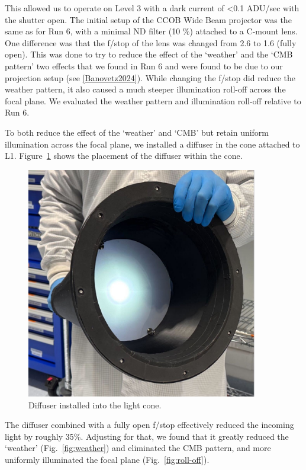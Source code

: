 This allowed us to operate on Level 3 with a dark current of
\textless0.1 ADU/sec with the shutter open. The initial setup of the
CCOB Wide Beam projector was the same as for Run 6, with a minimal ND filter (10 \%)
attached to a C-mount lens. One difference was that the f/stop of the lens
was changed from 2.6 to 1.6 (fully open). This was done to try to
reduce the effect of the `weather' and
the `CMB pattern' two effects that we
found in Run 6 and were found to be due to our projection setup (see
\hyperref[Banovetz2024]{{[}Banovetz2024{]}}). While changing  the f/stop  did
reduce the weather pattern, it also caused a much steeper illumination roll-off
across the focal plane. We evaluated the weather pattern and illumination roll-off relative to Run 6.


To both reduce the effect of the
`weather' and
`CMB' but retain uniform illumination
across the focal plane, we installed a diffuser in the cone attached to
L1. Figure~\ref{fig:diffuser} shows the placement of the diffuser within the cone.

\begin{figure}
\centering
\includegraphics[width=0.9\textwidth]{sections/figures/Diffuser.jpg}
\caption{Diffuser installed into the light cone.}
\label{fig:diffuser}
\end{figure}

The diffuser combined with a fully open f/stop effectively reduced the
incoming light by roughly 35\%. Adjusting for that, we found that it
greatly reduced the `weather' (Fig.~\ref{fig:weather})  and
eliminated the CMB pattern, and more uniformly illuminated the focal
plane  (Fig.~\ref{fig:roll-off}). 

